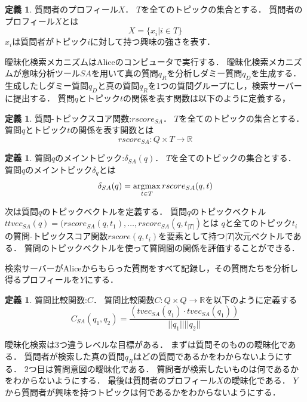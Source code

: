 \documentclass[master]{suribt}
\theoremstyle{definition}
\newtheorem{defi}[thm]{定義}
\newcommand{\argmax}{\mathop{\rm argmax}\limits}
\begin{document}
 \begin{defi}{質問者のプロフィール$X$．}
  $T$を全てのトピックの集合とする．
  質問者のプロフィール$X$とは
  \begin{equation}
   X = \{x_i| i \in T\}
  \end{equation}
  $x_i$は質問者がトピック$i$に対して持つ興味の強さを表す．
 \end{defi}
 曖昧化検索メカニズムはAliceのコンピュータで実行する．
 曖昧化検索メカニズムが意味分析ツール$SA$を用いて真の質問$q_R$を分析しダミー質問$q_D$を生成する．
 生成したしダミー質問$q_D$と真の質問$q_R$を1つの質問グループにし，検索サーバーに提出する．
 質問$q$とトピック$t$の関係を表す関数は以下のように定義する，
 
 \begin{defi}{質問-トピックスコア関数:$rscore_{SA}$．}
  $T$を全てのトピックの集合とする．
  質問$q$とトピック$t$の関係を表す関数とは
  \begin{equation}
   rscore_{SA}:Q \times T \to \mathbb{R}
  \end{equation}
 \end{defi}

 \begin{defi}{質問$q$のメイントピック:$\delta_{SA}(q)$．}
  $T$を全てのトピックの集合とする．
  質問$q$のメイントピック$\delta_q$とは
  \begin{equation}
   \delta_{SA}(q) = \argmax_{t \in T} rscore_{SA}(q,t)
  \end{equation}
 \end{defi}

 次は質問$q$のトピックベクトルを定義する．
 質問$q$のトピックベクトル$ttvec_{SA}(q) = (rscore_{SA}(q,t_1 ), \dots , rscore_{SA}(q,t_{|T|})$とは
 $q$と全てのトピック$t_i$の質問-トピックスコア関数$rscore(q, t_i)$を要素として持つ$|T|$次元ベクトルである．
 質問のトピックベクトルを使って質問間の関係を評価することができる．

 検索サーバーがAliceからもらった質問をすべて記録し，その質問たちを分析し得るプロフィールを$Y$にする．

 \begin{defi}{質問比較関数:$C$．}
  質問比較関数$C:Q \times Q \rightarrow \mathbb{R}$を以下のように定義する
  \begin{equation}
  C_{SA}(q_1,q_2) = \frac{(tvec_{SA}(q_1) \cdot tvec_{SA}(q_1))}{||q_1|| ||q_2||}
  \end{equation}
 \end{defi}
 
 
 曖昧化検索は3つ違うレベルな目標がある．
 まずは質問そのものの曖昧化である．
 質問者が検索した真の質問$q_R$はどの質問であるかをわからないようにする．
 2つ目は質問意図の曖昧化である．
 質問者が検索したいものは何であるかをわからないようにする．
 最後は質問者のプロフィール$X$の曖昧化である．
 $Y$から質問者が興味を持つトピックは何であるかをわからないようにする．
 
\end{document}
